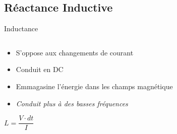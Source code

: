 \subsection{Réactance Inductive}
\begin{frame}{Inductance}
    \begin{columns}
        \begin{column}{0.66\textwidth}
            \begin{itemize}
                \item S'oppose aux changements de courant
                \item Conduit en DC
                \item Emmagasine l'énergie dans les champs magnétique
                \item \textit{Conduit plus à des basses fréquences}
            \end{itemize}
            \par
            \begin{center}
                \Large{$L = \dfrac{V \cdot dt}{I}$}
            \end{center}
        \end{column}
        \begin{column}{0.33\textwidth}
            \begin{figure}
                \centering
            \end{figure}
        \end{column}
    \end{columns}
\end{frame}

